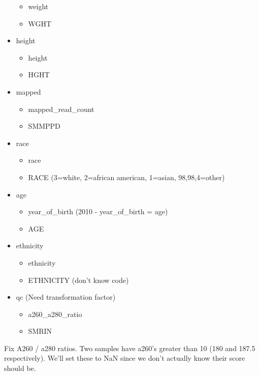 \documentclass{article}
\providecommand{\tightlist}{%
      \setlength{\itemsep}{0pt}\setlength{\parskip}{0pt}}
\begin{document}
\begin{itemize}
  \begin{itemize}
  \tightlist
  \item
    weight
  \item
    WGHT
  \end{itemize}
\item
  height

  \begin{itemize}
  \tightlist
  \item
    height
  \item
    HGHT
  \end{itemize}
\item
  mapped

  \begin{itemize}
  \tightlist
  \item
    mapped\_read\_count
  \item
    SMMPPD
  \end{itemize}
\item
  race

  \begin{itemize}
  \tightlist
  \item
    race
  \item
    RACE (3=white, 2=african american, 1=asian, 98,98,4=other)
  \end{itemize}
\item
  age

  \begin{itemize}
  \tightlist
  \item
    year\_of\_birth (2010 - year\_of\_birth = age)
  \item
    AGE
  \end{itemize}
\item
  ethnicity

  \begin{itemize}
  \tightlist
  \item
    ethnicity
  \item
    ETHNICITY (don't know code)
  \end{itemize}
\item
  qc (Need transformation factor)

  \begin{itemize}
  \tightlist
  \item
    a260\_a280\_ratio
  \item
    SMRIN
  \end{itemize}
\end{itemize}

    Fix A260 / a280 ratios. Two samples have a260's greater than 10 (180 and
187.5 respectively). We'll set these to NaN since we don't actually know
their score should be.
\end{document}
